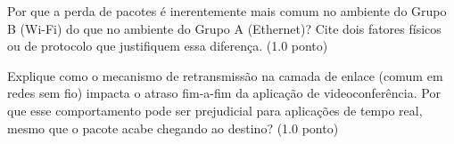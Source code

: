 \documentclass[11pt, addpoints]{modelo/prova2}
\begin{document}
    \begin{choices}
        \item Por que a perda de pacotes é inerentemente mais comum no ambiente do Grupo B (Wi-Fi) do que no ambiente do Grupo A (Ethernet)? Cite dois fatores físicos ou de protocolo que justifiquem essa diferença. (1.0 ponto)
        \item Explique como o mecanismo de retransmissão na camada de enlace (comum em redes sem fio) impacta o atraso fim-a-fim da aplicação de videoconferência. Por que esse comportamento pode ser prejudicial para aplicações de tempo real, mesmo que o pacote acabe chegando ao destino? (1.0 ponto)
    \end{choices}
\end{document}
